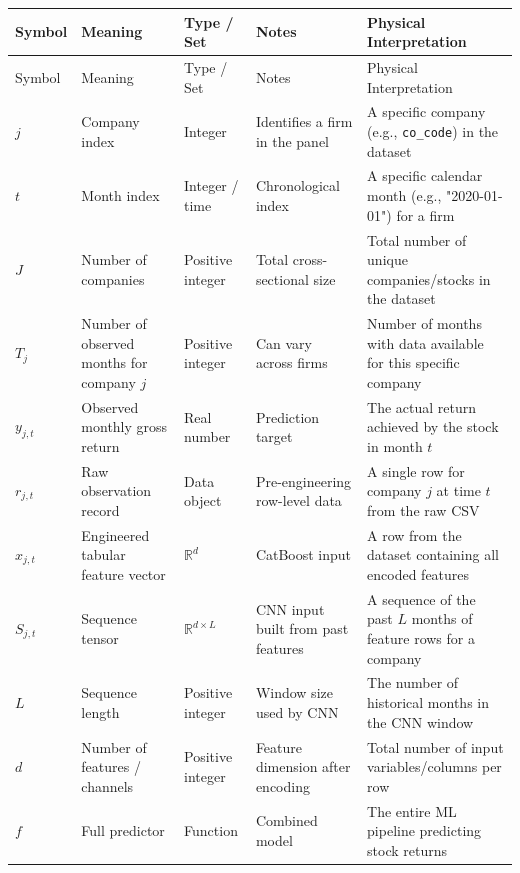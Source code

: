 \documentclass[11pt]{article}
\newcommand{\1}{\mathbf{1}}
\begin{document}
\begin{longtable}{>{\raggedright\arraybackslash}p{}
                  >{\raggedright\arraybackslash}p{}
                  >{\raggedright\arraybackslash}p{}
                  >{\raggedright\arraybackslash}p{}
                  >{\raggedright\arraybackslash}p{}}
\toprule
Symbol & Meaning & Type / Set & Notes & Physical Interpretation \\
\midrule
\endfirsthead

\toprule
Symbol & Meaning & Type / Set & Notes & Physical Interpretation \\
\midrule
\endhead

$j$ & Company index & Integer & Identifies a firm in the panel & A specific company (e.g., \texttt{co\_code}) in the dataset \\
$t$ & Month index & Integer / time & Chronological index & A specific calendar month (e.g., "2020-01-01") for a firm \\
$J$ & Number of companies & Positive integer & Total cross-sectional size & Total number of unique companies/stocks in the dataset \\
$T_j$ & Number of observed months for company $j$ & Positive integer & Can vary across firms & Number of months with data available for this specific company \\
$y_{j,t}$ & Observed monthly gross return & Real number & Prediction target & The actual return achieved by the stock in month $t$ \\
$r_{j,t}$ & Raw observation record & Data object & Pre-engineering row-level data & A single row for company $j$ at time $t$ from the raw CSV \\
$x_{j,t}$ & Engineered tabular feature vector & $\mathbb{R}^d$ & CatBoost input & A row from the dataset containing all encoded features \\
$S_{j,t}$ & Sequence tensor & $\mathbb{R}^{d \times L}$ & CNN input built from past features & A sequence of the past $L$ months of feature rows for a company \\
$L$ & Sequence length & Positive integer & Window size used by CNN & The number of historical months in the CNN window \\
$d$ & Number of features / channels & Positive integer & Feature dimension after encoding & Total number of input variables/columns per row \\
$f$ & Full predictor & Function & Combined model & The entire ML pipeline predicting stock returns \\

\end{longtable}
\end{document}
